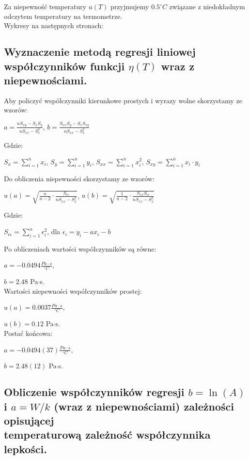 \documentclass[12pt]{article}
\begin{document}
Za niepewność temperatury $u(T)$ przyjmujemy $0.5^{\circ}C$ związane
z niedokładnym odczytem temperatury na termometrze. \\ 
Wykresy na następnych stronach:



\subsection*{Wyznaczenie metodą regresji liniowej współczynników funkcji $\eta(T)$
    wraz z niepewnościami.}

Aby policzyć współczynniki kierunkowe prostych i wyrazy wolne skorzystamy ze wzorów:

\begin{center}
    $a = \frac{nS_{xy} - S_xS_y}{nS_{xx}-S_x^2}$, $b =\frac{S_{xx}S_y-S_xS_{xy}}{nS_{xx}-S_x^2}$
\end{center}
Gdzie:
\begin{center}
    $S_x=\displaystyle\sum_{i=1}^{n}x_i$,
    $S_y=\displaystyle\sum_{i=1}^{n}y_i$,
    $S_{xx}=\displaystyle\sum_{i=1}^{n}x_i^2$,
    $S_{xy}=\displaystyle\sum_{i=1}^{n}x_i \cdot y_i$ \\
\end{center}
Do obliczenia niepewności skorzystamy ze wzorów:
\begin{center}
    $u(a) = \sqrt{\frac{n}{n-2} \cdot
            \frac{S_{\epsilon\epsilon}}{nS_{xx}-S_x^2}}$, $u(b) = \sqrt{\frac{1}{n-2} \cdot
        \frac{S_{xx}S_{\epsilon\epsilon}}{nS_{xx}-S_x^2}}$ \\
\end{center}
Gdzie:
\begin{center}
    $S_{\epsilon\epsilon}=\displaystyle\sum_{i=1}^{n}\epsilon_i^2$, dla $\epsilon_i = y_i - ax_i - b$
\end{center}
Po obliczeniach wartości współczynników są równe:

$a = -0.0494 \frac{Pa \cdot s}{^{\circ}C}$,

$b = 2.48$ Pa$\cdot$s. \\
Wartości niepewności współczynników prostej:

$u(a) = 0.0037 \frac{Pa \cdot s}{^{\circ}C}$,

$u(b) = 0.12$ Pa$\cdot$s. \\
Postać końcowa:

$a = -0.0494(37) \frac{Pa \cdot s}{^{\circ}C}$,

$b = 2.48(12)$ Pa$\cdot$s.

\subsection*{Obliczenie współczynników regresji $b=\ln(A)$ i $a= W/k$
    (wraz z niepewnościami) zależności opisującej \\
    temperaturową zależność współczynnika lepkości.}
\end{document}
